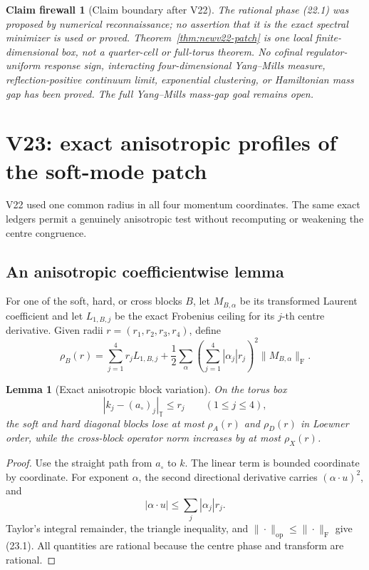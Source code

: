 \documentclass[11pt,oneside]{article}
\newtheorem{lemma}[theorem]{Lemma}
\newtheorem{firewall}[theorem]{Claim firewall}
\theoremstyle{definition}
\theoremstyle{remark}
\begin{document}
\begin{firewall}[Claim boundary after V22]
\label{fire:newv22-final}
The rational phase (22.1) was proposed by numerical reconnaissance;
no assertion that it is the exact spectral minimizer is used or
proved.  Theorem~\ref{thm:newv22-patch} is one local
finite-dimensional box, not a quarter-cell or full-torus theorem.
No cofinal regulator-uniform response sign, interacting
four-dimensional Yang--Mills measure, reflection-positive continuum
limit, exponential clustering, or Hamiltonian mass gap has been
proved.  The full Yang--Mills mass-gap goal remains open.
\end{firewall}

\section{V23: exact anisotropic profiles of the soft-mode patch}
\label{sec:newv23-anisotropic}

V22 used one common radius in all four momentum coordinates.  The
same exact ledgers permit a genuinely anisotropic test without
recomputing or weakening the centre congruence.

\subsection{An anisotropic coefficientwise lemma}

For one of the soft, hard, or cross blocks \(B\), let
\(M_{B,\alpha}\) be its transformed Laurent coefficient and let
\(L_{1,B,j}\) be the exact Frobenius ceiling for its \(j\)-th centre
derivative.  Given radii \(r=(r_1,r_2,r_3,r_4)\), define
\[
 \rho_B(r)
 =
 \sum_{j=1}^4r_jL_{1,B,j}
 +\frac12\sum_\alpha
 \left(\sum_{j=1}^4|\alpha_j|r_j\right)^2
 \|M_{B,\alpha}\|_{\mathrm F}.                           \tag{23.1}
\]

\begin{lemma}[Exact anisotropic block variation]
\label{lem:newv23-anisotropic}
On the torus box
\[
 |k_j-(a_\circ)_j|_{\mathbb T}\le r_j
 \qquad(1\le j\le4),                                    \tag{23.2}
\]
the soft and hard diagonal blocks lose at most
\(\rho_A(r)\) and \(\rho_D(r)\) in Loewner order, while the
cross-block operator norm increases by at most \(\rho_X(r)\).
\end{lemma}

\begin{proof}
Use the straight path from \(a_\circ\) to \(k\).  The linear term is
bounded coordinate by coordinate.  For exponent \(\alpha\), the
second directional derivative carries
\((\alpha\cdot u)^2\), and
\[
 |\alpha\cdot u|
 \le\sum_j|\alpha_j|r_j.                                 \tag{23.3}
\]
Taylor's integral remainder, the triangle inequality, and
\(\|\cdot\|_{\mathrm{op}}\le\|\cdot\|_{\mathrm F}\) give (23.1).
All quantities are rational because the centre phase and transform
are rational.
\end{proof}
\end{document}
